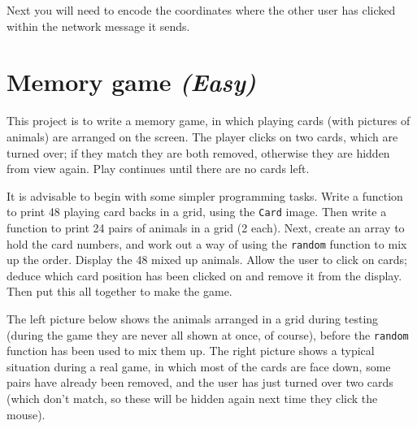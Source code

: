 \documentclass[12pt,a4paper,twoside]{article}
\renewcommand{\_}{\texttt{\symbol{95}}}
\begin{document}
Next you will need to encode the coordinates where the other user has
clicked within the network message it sends.

\newpage
\section{Memory game \it{(Easy)}}

This project is to write a memory game, in which playing cards (with
pictures of animals) are arranged on the screen. The player clicks
on two cards, which are turned over; if they match they are both removed,
otherwise they are hidden from view again. Play continues until there
are no cards left.

It is advisable to begin with some simpler programming tasks.
Write a function to print 48 playing card backs in a grid, using the
\verb^Card^ image. Then write a function to print 24 pairs of animals
in a grid (2 each). Next, create an array
to hold the card numbers, and work out a way of using the
\verb^random^ function to mix up the order. Display the
48 mixed up animals. Allow the user to click on cards; deduce
which card position has been clicked on and remove it from the
display. Then put this all together to make the game.

The left picture below shows the animals arranged in a grid during testing
(during the game they are never all shown at once, of course), before
the \verb^random^ function has been used to mix them up. The right picture
shows a typical situation during a real game, in which most of the cards
are face down, some pairs have already been removed, and the user has
just turned over two cards (which don't match, so these will be hidden
again next time they click the mouse).
\end{document}
